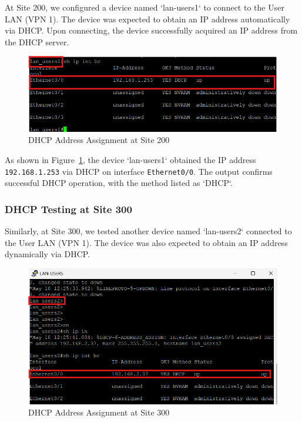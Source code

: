 \documentclass[12pt,english]{report}
\begin{document}
At Site 200, we configured a device named `lan-users1` to connect to the User LAN (VPN 1). The device was expected to obtain an IP address automatically via DHCP. Upon connecting, the device successfully acquired an IP address from the DHCP server.

\begin{figure}[H]
    \centering
    \includegraphics[width=1\textwidth]{chapter 4/dhcp-vpn1.png}
    \caption{DHCP Address Assignment at Site 200}
    \label{fig:dhcp_test_site200}
\end{figure}

As shown in Figure~\ref{fig:dhcp_test_site200}, the device `lan-users1` obtained the IP address \texttt{192.168.1.253} via DHCP on interface \texttt{Ethernet0/0}. The output confirms successful DHCP operation, with the method listed as `DHCP`.

\subsubsection{DHCP Testing at Site 300}

Similarly, at Site 300, we tested another device named `lan-users2` connected to the User LAN (VPN 1). The device was also expected to obtain an IP address dynamically via DHCP.

\begin{figure}[H]
    \centering
    \includegraphics[width=1\textwidth]{chapter 4/dhcp-vpn1-2.png}
    \caption{DHCP Address Assignment at Site 300}
    \label{fig:dhcp_test_site300}
\end{figure}
\end{document}
